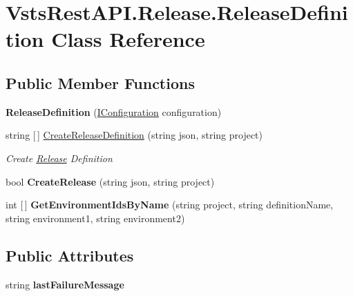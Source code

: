\hypertarget{class_vsts_rest_a_p_i_1_1_release_1_1_release_definition}{}\section{Vsts\+Rest\+A\+P\+I.\+Release.\+Release\+Definition Class Reference}
\label{class_vsts_rest_a_p_i_1_1_release_1_1_release_definition}
\subsection*{Public Member Functions}
\begin{DoxyCompactItemize}
\item 
\mbox{\label{class_vsts_rest_a_p_i_1_1_release_1_1_release_definition_a7e29d1c6493b62537d3bd70990fab5f7}} 
{\bfseries Release\+Definition} (\mbox{\hyperlink{interface_vsts_rest_a_p_i_1_1_i_configuration}{I\+Configuration}} configuration)
\item 
string \mbox{[}$\,$\mbox{]} \mbox{\hyperlink{class_vsts_rest_a_p_i_1_1_release_1_1_release_definition_a3e03bd4ea027dca1c1cda2e0fe8ca73d}{Create\+Release\+Definition}} (string json, string project)
\begin{DoxyCompactList}\small\item\em Create \mbox{\hyperlink{namespace_vsts_rest_a_p_i_1_1_release}{Release}} Definition \end{DoxyCompactList}\item 
\mbox{\label{class_vsts_rest_a_p_i_1_1_release_1_1_release_definition_a6b9d8b14e1417216140cf0493a55b013}} 
bool {\bfseries Create\+Release} (string json, string project)
\item 
\mbox{\label{class_vsts_rest_a_p_i_1_1_release_1_1_release_definition_ad1c33d32a37963808c99742b82010bf8}} 
int \mbox{[}$\,$\mbox{]} {\bfseries Get\+Environment\+Ids\+By\+Name} (string project, string definition\+Name, string environment1, string environment2)
\end{DoxyCompactItemize}
\subsection*{Public Attributes}
\begin{DoxyCompactItemize}
\item 
\mbox{\label{class_vsts_rest_a_p_i_1_1_release_1_1_release_definition_a0e13c618a8d0efeabb6fd8751249387a}} 
string {\bfseries last\+Failure\+Message}
\end{DoxyCompactItemize}


